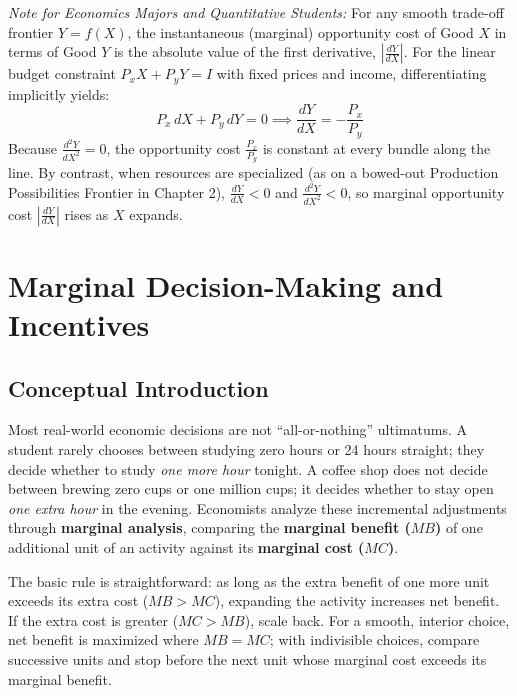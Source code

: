 \documentclass[11pt,letterpaper]{article}
\begin{document}
\begin{tcolorbox}[colback=blue!5!white,colframe=blue!75!black,title=\textbf{Optional Advanced Section: Calculus of Opportunity Cost and Slopes}]
\small
\emph{Note for Economics Majors and Quantitative Students:}
For any smooth trade-off frontier $Y = f(X)$, the instantaneous (marginal) opportunity cost of Good $X$ in terms of Good $Y$ is the absolute value of the first derivative, $\left|\frac{dY}{dX}\right|$. For the linear budget constraint $P_x X + P_y Y = I$ with fixed prices and income, differentiating implicitly yields:
\[
P_x\,dX + P_y\,dY = 0 \implies \frac{dY}{dX} = -\frac{P_x}{P_y}
\]
Because $\frac{d^2 Y}{dX^2} = 0$, the opportunity cost $\frac{P_x}{P_y}$ is constant at every bundle along the line. By contrast, when resources are specialized (as on a bowed-out Production Possibilities Frontier in Chapter 2), $\frac{dY}{dX} < 0$ and $\frac{d^2 Y}{dX^2} < 0$, so marginal opportunity cost $\left|\frac{dY}{dX}\right|$ rises as $X$ expands.
\end{tcolorbox}

\section{Marginal Decision-Making and Incentives}

\subsection*{Conceptual Introduction}
Most real-world economic decisions are not ``all-or-nothing'' ultimatums. A student rarely chooses between studying zero hours or 24 hours straight; they decide whether to study \emph{one more hour} tonight. A coffee shop does not decide between brewing zero cups or one million cups; it decides whether to stay open \emph{one extra hour} in the evening. Economists analyze these incremental adjustments through \textbf{marginal analysis}, comparing the \textbf{marginal benefit ($MB$)} of one additional unit of an activity against its \textbf{marginal cost ($MC$)}.

The basic rule is straightforward: as long as the extra benefit of one more unit exceeds its extra cost ($MB > MC$), expanding the activity increases net benefit. If the extra cost is greater ($MC > MB$), scale back. For a smooth, interior choice, net benefit is maximized where $MB=MC$; with indivisible choices, compare successive units and stop before the next unit whose marginal cost exceeds its marginal benefit.
\end{document}
